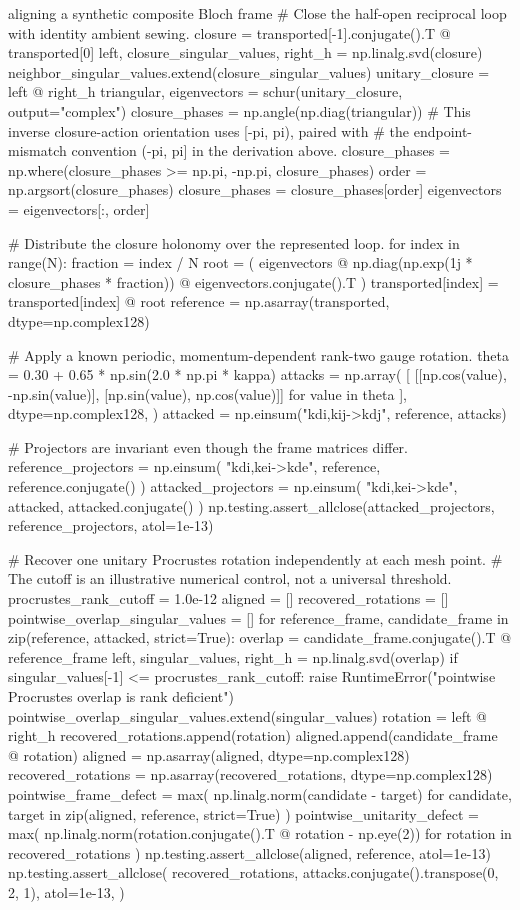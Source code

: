 \begin{pythonexample}{aligning a synthetic composite Bloch frame}
# Close the half-open reciprocal loop with identity ambient sewing.
closure = transported[-1].conjugate().T @ transported[0]
left, closure_singular_values, right_h = np.linalg.svd(closure)
neighbor_singular_values.extend(closure_singular_values)
unitary_closure = left @ right_h
triangular, eigenvectors = schur(unitary_closure, output="complex")
closure_phases = np.angle(np.diag(triangular))
# This inverse closure-action orientation uses [-pi, pi), paired with
# the endpoint-mismatch convention (-pi, pi] in the derivation above.
closure_phases = np.where(closure_phases >= np.pi, -np.pi, closure_phases)
order = np.argsort(closure_phases)
closure_phases = closure_phases[order]
eigenvectors = eigenvectors[:, order]

# Distribute the closure holonomy over the represented loop.
for index in range(N):
    fraction = index / N
    root = (
        eigenvectors
        @ np.diag(np.exp(1j * closure_phases * fraction))
        @ eigenvectors.conjugate().T
    )
    transported[index] = transported[index] @ root
reference = np.asarray(transported, dtype=np.complex128)

# Apply a known periodic, momentum-dependent rank-two gauge rotation.
theta = 0.30 + 0.65 * np.sin(2.0 * np.pi * kappa)
attacks = np.array(
    [
        [[np.cos(value), -np.sin(value)],
         [np.sin(value), np.cos(value)]]
        for value in theta
    ],
    dtype=np.complex128,
)
attacked = np.einsum("kdi,kij->kdj", reference, attacks)

# Projectors are invariant even though the frame matrices differ.
reference_projectors = np.einsum(
    "kdi,kei->kde", reference, reference.conjugate()
)
attacked_projectors = np.einsum(
    "kdi,kei->kde", attacked, attacked.conjugate()
)
np.testing.assert_allclose(attacked_projectors, reference_projectors, atol=1e-13)

# Recover one unitary Procrustes rotation independently at each mesh point.
# The cutoff is an illustrative numerical control, not a universal threshold.
procrustes_rank_cutoff = 1.0e-12
aligned = []
recovered_rotations = []
pointwise_overlap_singular_values = []
for reference_frame, candidate_frame in zip(reference, attacked, strict=True):
    overlap = candidate_frame.conjugate().T @ reference_frame
    left, singular_values, right_h = np.linalg.svd(overlap)
    if singular_values[-1] <= procrustes_rank_cutoff:
        raise RuntimeError("pointwise Procrustes overlap is rank deficient")
    pointwise_overlap_singular_values.extend(singular_values)
    rotation = left @ right_h
    recovered_rotations.append(rotation)
    aligned.append(candidate_frame @ rotation)
aligned = np.asarray(aligned, dtype=np.complex128)
recovered_rotations = np.asarray(recovered_rotations, dtype=np.complex128)
pointwise_frame_defect = max(
    np.linalg.norm(candidate - target)
    for candidate, target in zip(aligned, reference, strict=True)
)
pointwise_unitarity_defect = max(
    np.linalg.norm(rotation.conjugate().T @ rotation - np.eye(2))
    for rotation in recovered_rotations
)
np.testing.assert_allclose(aligned, reference, atol=1e-13)
np.testing.assert_allclose(
    recovered_rotations,
    attacks.conjugate().transpose(0, 2, 1),
    atol=1e-13,
)


\end{pythonexample}
